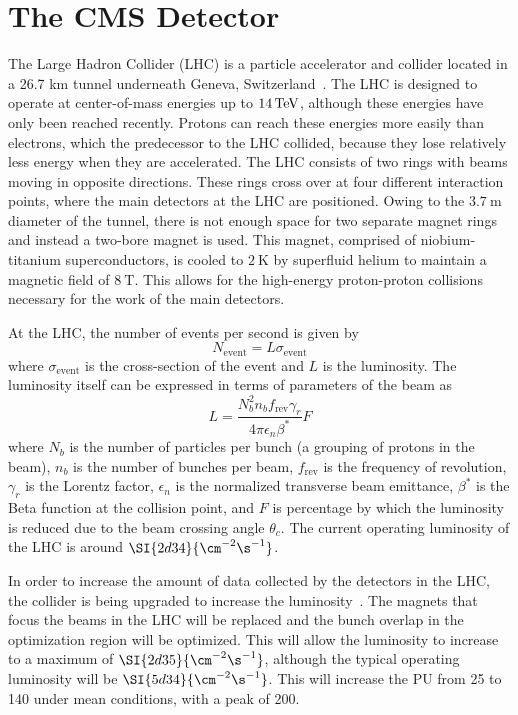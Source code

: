 \chapter{The CMS Detector}
The Large Hadron Collider (LHC) is a particle accelerator and collider located in a 26.7 km tunnel underneath Geneva, Switzerland~\cite{Evans_2008}. The LHC is designed to operate at center-of-mass energies up to $\TeV{14}$, although these energies have only been reached recently. Protons can reach these energies more easily than electrons, which the predecessor to the LHC collided, because they lose relatively less energy when they are accelerated. The LHC consists of two rings with beams moving in opposite directions. These rings cross over at four different interaction points, where the main detectors at the LHC are positioned. Owing to the $\SI{3.7}{\m}$ diameter of the tunnel, there is not enough space for two separate magnet rings and instead a two-bore magnet is used. This magnet, comprised of niobium-titanium superconductors, is cooled to $\SI{2}{\kelvin}$ by superfluid helium to maintain a magnetic field of $\SI{8}{\tesla}$. This allows for the high-energy proton-proton collisions necessary for the work of the main detectors. 

At the LHC, the number of events per second is given by 
\begin{equation}
    N_\text{event} = L\sigma_\text{event}
\end{equation}
where $\sigma_\text{event}$ is the cross-section of the event and $L$ is the luminosity. The luminosity itself can be expressed in terms of parameters of the beam as
\begin{equation}
    L = \frac{N_b^2n_bf_\text{rev}\gamma_r}{4\pi\epsilon_n\beta^*}F
\end{equation}
where $N_b$ is the number of particles per bunch (a grouping of protons in the beam), $n_b$ is the number of bunches per beam, $f_\text{rev}$ is the frequency of revolution, $\gamma_r$ is the Lorentz factor, $\epsilon_n$ is the normalized transverse beam emittance, $\beta^*$ is the Beta function at the collision point, and $F$ is percentage by which the luminosity is reduced due to the beam crossing angle $\theta_c$. The current operating luminosity of the LHC is around $\SI{2d34}{\cm^{-2}\s^{-1}}$.

In order to increase the amount of data collected by the detectors in the LHC, the collider is being upgraded to increase the luminosity~\cite{Contardo:2020886}. The magnets that focus the beams in the LHC will be replaced and the bunch overlap in the optimization region will be optimized. This will allow the luminosity to increase to a maximum of $\SI{2d35}{\cm^{-2}\s^{-1}}$, although the typical operating luminosity will be $\SI{5d34}{\cm^{-2}\s^{-1}}$. This will increase the PU from 25 to 140 under mean conditions, with a peak of 200.

